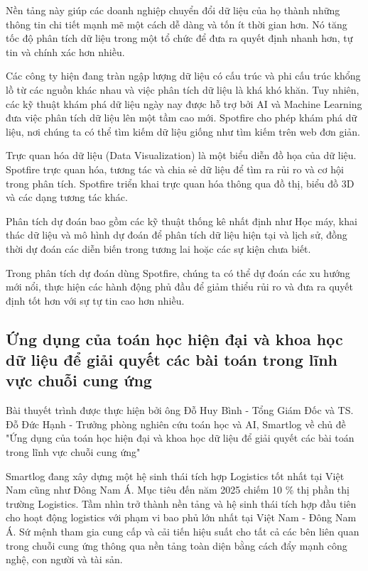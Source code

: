 \documentclass[14pt, a4paper]{article}
\numberwithin{equation}{section}
\numberwithin{figure}{section}
\numberwithin{dl}{section}
\numberwithin{md}{section}
\numberwithin{bd}{section}
\numberwithin{dn}{section}
\numberwithin{hq}{section}
\begin{document}
    Nền tảng này giúp các doanh nghiệp chuyển đổi dữ liệu của họ thành những thông tin chi tiết mạnh mẽ một cách dễ dàng và tốn ít thời gian hơn. Nó tăng tốc độ phân tích dữ liệu trong một tổ chức để đưa ra quyết định nhanh hơn, tự tin và chính xác hơn nhiều.

    Các công ty hiện đang tràn ngập lượng dữ liệu có cấu trúc và phi cấu trúc khổng lồ từ các nguồn khác nhau và việc phân tích dữ liệu là khá khó khăn. Tuy nhiên, các kỹ thuật khám phá dữ liệu ngày nay được hỗ trợ bởi AI và Machine Learning đưa việc phân tích dữ liệu lên một tầm cao mới. Spotfire cho phép khám phá dữ liệu, nơi chúng ta có thể tìm kiếm dữ liệu giống như tìm kiếm trên web đơn giản.

    Trực quan hóa dữ liệu (Data Visualization) là một biểu diễn đồ họa của dữ liệu. Spotfire trực quan hóa, tương tác và chia sẻ dữ liệu để tìm ra rủi ro và cơ hội trong phân tích. Spotfire triển khai trực quan hóa thông qua đồ thị, biểu đồ 3D và các dạng tương tác khác.

    Phân tích dự đoán bao gồm các kỹ thuật thống kê nhất định như Học máy, khai thác dữ liệu và mô hình dự đoán để phân tích dữ liệu hiện tại và lịch sử, đồng thời dự đoán các diễn biến trong tương lai hoặc các sự kiện chưa biết.

    Trong phân tích dự đoán dùng Spotfire, chúng ta có thể dự đoán các xu hướng mới nổi, thực hiện các hành động phủ đầu để giảm thiểu rủi ro và đưa ra quyết định tốt hơn với sự tự tin cao hơn nhiều.
    \subsection{Ứng dụng của toán học hiện đại và khoa học dữ liệu để giải quyết các bài toán trong lĩnh vực chuỗi cung ứng}

    Bài thuyết trình được thực hiện bởi ông Đỗ Huy Bình - Tổng Giám Đốc và TS. Đỗ Đức Hạnh - Trưởng phòng nghiên cứu toán học và AI, 
    Smartlog về chủ đề "Ứng dụng của toán học hiện đại và khoa học dữ liệu để giải quyết các bài toán trong lĩnh vực chuỗi cung ứng"
    
    Smartlog đang xây dựng một hệ sinh thái tích hợp Logistics tốt nhất tại Việt Nam cũng như Đông Nam Á.
    Mục tiêu đến năm 2025 chiếm 10 \% thị phần thị trường Logistics.
    Tầm nhìn trở thành nền tảng và hệ sinh thái tích hợp đầu tiên cho hoạt động logistics với phạm vi bao phủ lớn nhất tại Việt Nam - Đông Nam Á.
    Sứ mệnh tham gia cung cấp và cải tiến hiệu suất cho tất cả các bên liên quan trong chuỗi cung ứng thông qua nền tảng toàn diện bằng cách đẩy mạnh công nghệ, con người và tài sản.
\end{document}

